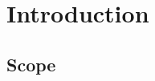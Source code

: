 \documentclass[../main.tex]{subfiles}
\begin{document}
\chapter{Introduction}
\section{Scope}
\end{document}
